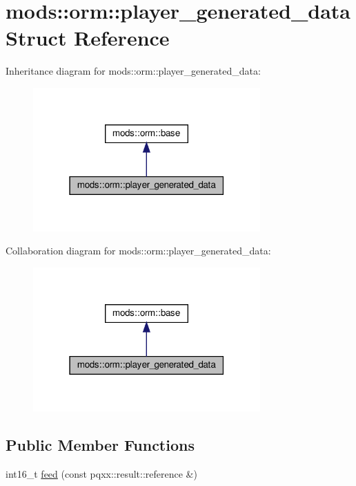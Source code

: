 \hypertarget{structmods_1_1orm_1_1player__generated__data}{}\section{mods\+:\+:orm\+:\+:player\+\_\+generated\+\_\+data Struct Reference}
\label{structmods_1_1orm_1_1player__generated__data}


Inheritance diagram for mods\+:\+:orm\+:\+:player\+\_\+generated\+\_\+data\+:\nopagebreak
\begin{figure}[H]
\begin{center}
\leavevmode
\includegraphics[width=247pt]{structmods_1_1orm_1_1player__generated__data__inherit__graph}
\end{center}
\end{figure}


Collaboration diagram for mods\+:\+:orm\+:\+:player\+\_\+generated\+\_\+data\+:\nopagebreak
\begin{figure}[H]
\begin{center}
\leavevmode
\includegraphics[width=247pt]{structmods_1_1orm_1_1player__generated__data__coll__graph}
\end{center}
\end{figure}
\subsection*{Public Member Functions}
\begin{DoxyCompactItemize}
\item 
int16\+\_\+t \hyperlink{structmods_1_1orm_1_1player__generated__data_ac6a622c219c6d50c3f054aef965e4363}{feed} (const pqxx\+::result\+::reference \&)
\end{DoxyCompactItemize}
